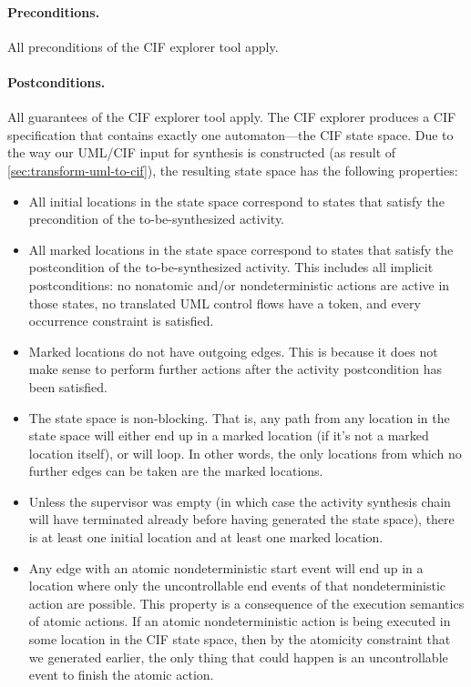 \documentclass{article}
\theoremstyle{definition}
\begin{document}
\paragraph{Preconditions.}
All preconditions of the CIF explorer tool apply.

\paragraph{Postconditions.}
All guarantees of the CIF explorer tool apply.
The CIF explorer produces a CIF specification that contains exactly one automaton---the CIF state space.
Due to the way our UML/CIF input for synthesis is constructed (as result of \autoref{sec:transform-uml-to-cif}), the resulting state space has the following properties:
\begin{itemize}
	\item All initial locations in the state space correspond to states that satisfy the precondition of the to-be-synthesized activity.
	\item All marked locations in the state space correspond to states that satisfy the postcondition of the to-be-synthesized activity.
	This includes all implicit postconditions: no nonatomic and/or nondeterministic actions are active in those states, no translated UML control flows have a token, and every occurrence constraint is satisfied.
	\item Marked locations do not have outgoing edges.
	This is because it does not make sense to perform further actions after the activity postcondition has been satisfied.
	\item The state space is non-blocking.
	That is, any path from any location in the state space will either end up in a marked location (if it's not a marked location itself), or will loop.
	In other words, the only locations from which no further edges can be taken are the marked locations.
	\item Unless the supervisor was empty (in which case the activity synthesis chain will have terminated already before having generated the state space), there is at least one initial location and at least one marked location.
	\item Any edge with an atomic nondeterministic start event will end up in a location where only the uncontrollable end events of that nondeterministic action are possible.
	This property is a consequence of the execution semantics of atomic actions.
	If an atomic nondeterministic action is being executed in some location in the CIF state space, then by the atomicity constraint that we generated earlier, the only thing that could happen is an uncontrollable event to finish the atomic action.
\end{itemize}
\end{document}
